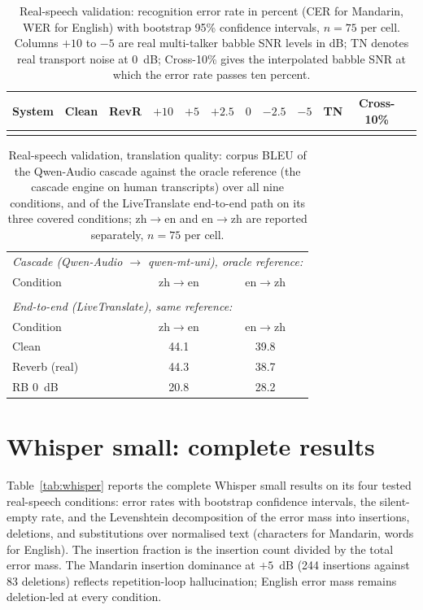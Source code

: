\documentclass[11pt]{article}
\begin{document}
\begin{table}
\centering
\caption{Real-speech validation: recognition error rate in percent
(CER for Mandarin, WER for English) with bootstrap 95\% confidence
intervals, $n = 75$ per cell. Columns $+10$ to $-5$ are real multi-talker
babble SNR levels in dB; TN denotes real transport noise at 0~dB;
Cross-10\% gives the interpolated babble SNR at
which the error rate passes ten percent.}
\label{tab:realval}
\footnotesize
\setlength{\tabcolsep}{3pt}
\begin{tabular}{lccccccccccc}
\toprule
System & Clean & RevR & $+10$ & $+5$ & $+2.5$ & $0$ & $-2.5$ & $-5$ & TN & Cross-10\% \\
\midrule
 \\
\bottomrule
\end{tabular}
\end{table}

\begin{table}[h]
\centering
\caption{Real-speech validation, translation quality: corpus BLEU of the
Qwen-Audio cascade against the oracle reference (the cascade engine on
human transcripts) over all nine conditions, and of the LiveTranslate
end-to-end path on its three covered conditions; zh$\to$en and en$\to$zh
are reported separately, $n = 75$ per cell.}
\label{tab:realmtpath}
\small
\begin{tabular}{lcc}
\toprule
\multicolumn{3}{l}{\emph{Cascade (Qwen-Audio $\to$ qwen-mt-uni), oracle reference:}} \\
Condition & zh$\to$en & en$\to$zh \\
\midrule
 \\
\midrule
\multicolumn{3}{l}{\emph{End-to-end (LiveTranslate), same reference:}} \\
Condition & zh$\to$en & en$\to$zh \\
\midrule
Clean & 44.1 & 39.8 \\
Reverb (real) & 44.3 & 38.7 \\
RB $0$~dB & 20.8 & 28.2 \\
\bottomrule
\end{tabular}
\end{table}

\section{Whisper small: complete results}
\label{supp:whisper}

Table~\ref{tab:whisper} reports the complete Whisper small results on its
four tested real-speech conditions: error rates with bootstrap confidence
intervals, the silent-empty rate, and the Levenshtein decomposition of the
error mass into insertions, deletions, and substitutions over normalised
text (characters for Mandarin, words for English). The insertion fraction
is the insertion count divided by the total error mass. The Mandarin
insertion dominance at $+5$~dB (244 insertions against 83 deletions)
reflects repetition-loop hallucination; English error mass remains
deletion-led at every condition.
\end{document}
